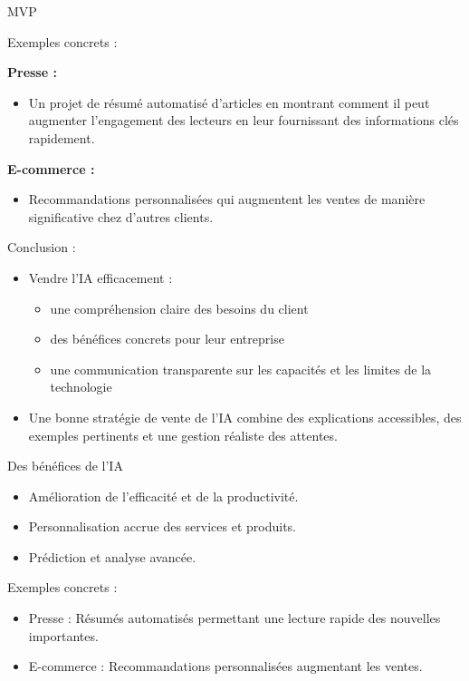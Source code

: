 \begin{frame}{MVP}
\end{frame}

\begin{frame}{Exemples concrets :}

\textbf{Presse :}
\begin{itemize}
\item Un projet de résumé automatisé d'articles en montrant comment il
  peut augmenter l'engagement des lecteurs en leur fournissant des
  informations clés rapidement.
\end{itemize}

\textbf{E-commerce :}
\begin{itemize}
\item Recommandations personnalisées qui augmentent les ventes de
  manière significative chez d'autres clients.
\end{itemize}
\end{frame}

\begin{frame}{Conclusion :}
\begin{itemize}
\item Vendre l'IA efficacement :
  \begin{itemize}
  \item une compréhension claire des besoins du client
  \item des bénéfices concrets pour leur entreprise
  \item une communication transparente sur les capacités et les
    limites de la technologie
  \end{itemize}
\item Une bonne stratégie de vente de l'IA combine des explications
  accessibles, des exemples pertinents et une gestion réaliste des
  attentes.
\end{itemize}
\end{frame}

\begin{frame}{Des bénéfices de l'IA}
\begin{itemize}
    \item Amélioration de l'efficacité et de la productivité.
    \item Personnalisation accrue des services et produits.
    \item Prédiction et analyse avancée.
\end{itemize}
\end{frame}

\begin{frame}{Exemples concrets :}
\begin{itemize}
\item Presse : Résumés automatisés permettant une lecture rapide des
  nouvelles importantes.
\item E-commerce : Recommandations personnalisées augmentant les
  ventes.
\end{itemize}

\end{frame}

